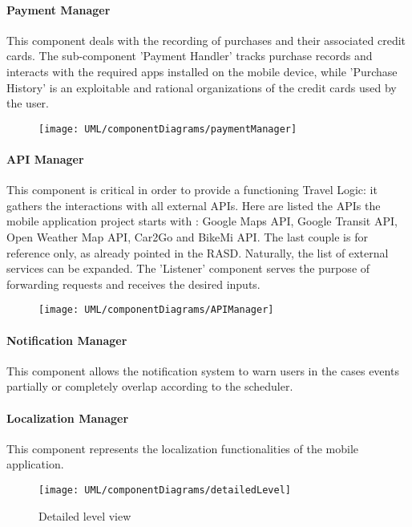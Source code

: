 \paragraph{Payment Manager}
	This component deals with the recording of purchases and their associated credit cards.
	The sub-component 'Payment Handler' tracks purchase records and interacts with the required apps installed on the mobile device, while 'Purchase History' is an exploitable and rational organizations of the credit cards used by the user.

	\begin{figure}[H]
		\centering
		\texttt{[image: UML/componentDiagrams/paymentManager]}
	\end{figure}
	

\paragraph{API Manager} 
	This component is critical in order to provide a functioning Travel Logic: it gathers the interactions with all external APIs.
	Here are listed the APIs the mobile application project starts with : Google Maps API, Google Transit API, Open Weather Map API, Car2Go and BikeMi API.
	The last couple is for reference only, as already pointed in the RASD. Naturally, the list of external services can be expanded.
	The 'Listener' component serves the purpose of forwarding requests and receives the desired inputs.
	
	\begin{figure}[H]
		\centering
		\texttt{[image: UML/componentDiagrams/APIManager]}
	\end{figure}
	
	
\paragraph{Notification Manager}
	This component allows the notification system to warn users in the cases events partially or completely overlap according to the scheduler.

\paragraph{Localization Manager}
	This component represents the localization functionalities of the mobile application.
	
\begin{landscape}
	\begin{figure}
		\centering
		\texttt{[image: UML/componentDiagrams/detailedLevel]}
		\caption{Detailed level view}
		\label{detailedHighLevel}
	\end{figure}
\end{landscape}




